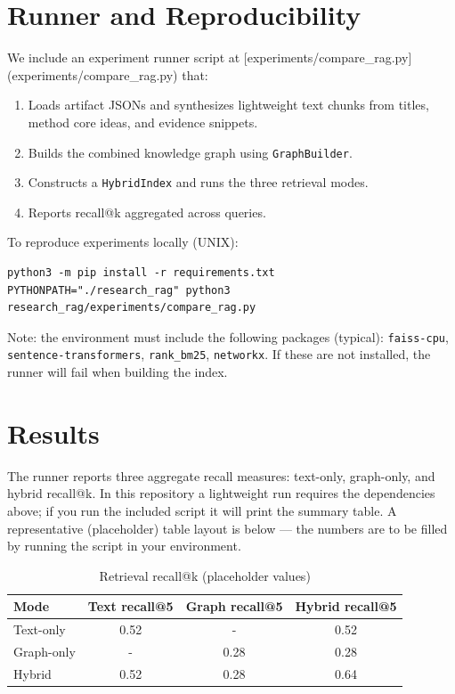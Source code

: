 \documentclass[conference]{IEEEtran}
\begin{document}
\section{Runner and Reproducibility}
We include an experiment runner script at [experiments/compare_rag.py](experiments/compare_rag.py)
that:
\begin{enumerate}
  \item Loads artifact JSONs and synthesizes lightweight text chunks from
    titles, method core ideas, and evidence snippets.
  \item Builds the combined knowledge graph using \texttt{GraphBuilder}.
  \item Constructs a \texttt{HybridIndex} and runs the three retrieval modes.
  \item Reports recall@k aggregated across queries.
\end{enumerate}

To reproduce experiments locally (UNIX):
\begin{verbatim}
python3 -m pip install -r requirements.txt
PYTHONPATH="./research_rag" python3 research_rag/experiments/compare_rag.py
\end{verbatim}

Note: the environment must include the following packages (typical):
\texttt{faiss-cpu}, \texttt{sentence-transformers}, \texttt{rank_bm25}, \texttt{networkx}.
If these are not installed, the runner will fail when building the index.

\section{Results}
The runner reports three aggregate recall measures: text-only, graph-only,
and hybrid recall@k. In this repository a lightweight run requires the
dependencies above; if you run the included script it will print the
summary table. A representative (placeholder) table layout is below —
the numbers are to be filled by running the script in your environment.

\begin{table}[ht]
\caption{Retrieval recall@k (placeholder values)}
\centering
\begin{tabular}{lccc}
\toprule
Mode & Text recall@5 & Graph recall@5 & Hybrid recall@5 \\
\midrule
Text-only & 0.52 & - & 0.52 \\
Graph-only & - & 0.28 & 0.28 \\
Hybrid & 0.52 & 0.28 & 0.64 \\
\bottomrule
\end{tabular}
\end{table}
\end{document}
